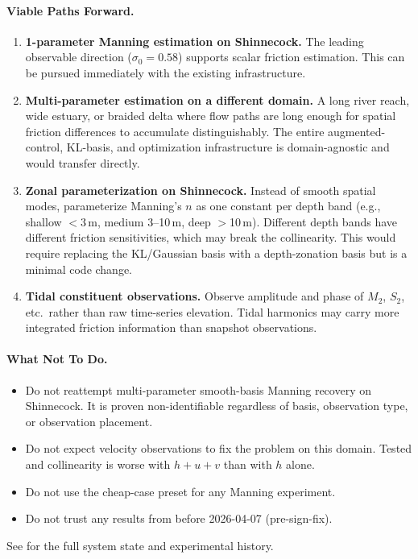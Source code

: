 \documentclass[11pt]{article}
\begin{document}
\paragraph{Viable Paths Forward.}
\begin{enumerate}
\item \textbf{1-parameter Manning estimation on Shinnecock.} The leading observable direction ($\sigma_0 = 0.58$) supports scalar friction estimation. This can be pursued immediately with the existing infrastructure.

\item \textbf{Multi-parameter estimation on a different domain.} A long river reach, wide estuary, or braided delta where flow paths are long enough for spatial friction differences to accumulate distinguishably. The entire augmented-control, KL-basis, and optimization infrastructure is domain-agnostic and would transfer directly.

\item \textbf{Zonal parameterization on Shinnecock.} Instead of smooth spatial modes, parameterize Manning's $n$ as one constant per depth band (e.g., shallow $<$3\,m, medium 3--10\,m, deep $>$10\,m). Different depth bands have different friction sensitivities, which may break the collinearity. This would require replacing the KL/Gaussian basis with a depth-zonation basis but is a minimal code change.

\item \textbf{Tidal constituent observations.} Observe amplitude and phase of $M_2$, $S_2$, etc.\ rather than raw time-series elevation. Tidal harmonics may carry more integrated friction information than snapshot observations.
\end{enumerate}

\paragraph{What Not To Do.}
\begin{itemize}
\item Do not reattempt multi-parameter smooth-basis Manning recovery on Shinnecock. It is proven non-identifiable regardless of basis, observation type, or observation placement.
\item Do not expect velocity observations to fix the problem on this domain. Tested and collinearity is worse with $h{+}u{+}v$ than with $h$ alone.
\item Do not use the cheap-case preset for any Manning experiment.
\item Do not trust any results from before 2026-04-07 (pre-sign-fix).
\end{itemize}

See  for the full system state and experimental history.
\end{document}
